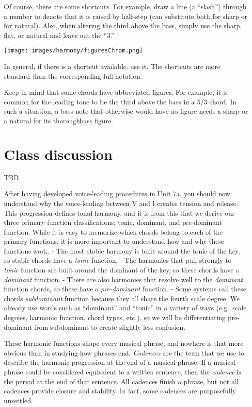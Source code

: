 \documentclass{book}
\begin{document}
Of course, there are some shortcuts. For example, draw a line (a ``slash'')
through a number to denote that it is raised by half-step (can substitute both
for sharp or for natural). Also, when altering the third above the bass,
simply use the sharp, flat, or natural and leave out the ``3.''

\texttt{[image: images/harmony/figuresChrom.png]}

In general, if there is a shortcut available, use it. The shortcuts are more
standard than the corresponding full notation.

Keep in mind that some chords have abbreviated figures. For example, it is
common for the leading tone to be the third above the bass in a 5/3 chord. In
such a situation, a bass note that otherwise would have no figure needs a
sharp or a natural for its thoroughbass figure.

\hypertarget{class-discussion}{%
\section{Class discussion}\label{class-discussion}}

TBD

After having developed voice-leading procedures in Unit 7a, you should now
understand why the voice-leading between V and I creates tension and release.
This progression defines tonal harmony, and it is from this that we derive our
three primary function classifications: tonic, dominant, and pre-dominant
function. While it is easy to memorize which chords belong to each of the
primary functions, it is more important to understand how and why these
functions work. - The most stable harmony is built around the tonic of the
key, so stable chords have a \emph{tonic} function. - The harmonies that pull
strongly to \emph{tonic} function are built around the dominant of the key, so
these chords have a \emph{dominant} function. - There are also harmonies that
resolve well to the \emph{dominant} function chords, so these have a
\emph{pre-dominant} function. - Some systems call these chords
\emph{subdominant} function because they all share the fourth scale degree. We
already use words such as ``dominant'' and ``tonic'' in a variety of ways
(e.g.~scale degrees, harmonic function, chord types, etc.), so we will be
differentiating pre-dominant from subdominant to create slightly less
confusion.

These harmonic functions shape every musical phrase, and nowhere is that more
obvious than in studying how phrases end. \emph{Cadences} are the term that we
use to describe the harmonic progression at the end of a musical phrase. If a
musical phrase could be considered equivalent to a written sentence, then the
\emph{cadence} is the period at the end of that sentence. All cadences finish
a phrase, but not all cadences provide closure and stability. In fact, some
cadences are purposefully unsettled.
\end{document}
